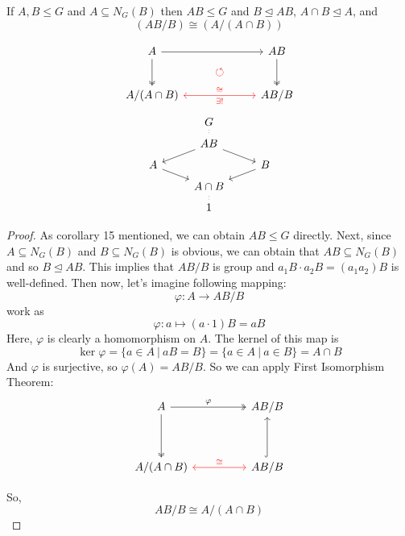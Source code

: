 \documentclass[12pt, a4paper, openany, twoside]{book}
\theoremstyle{definition}
\theoremstyle{remark}
\theoremstyle{plain}
\numberwithin{equation}{section}
\begin{document}
\begin{tcolorbox}[colback=yellow!10!white,colframe=blue!75!black,title=Second Isomorphism Theorem]

If $A, B \leq G$ and $A \subseteq N_G(B)$ then $AB \leq G$ and $B \trianglelefteq AB$, $A\cap B \trianglelefteq A$, and 
\[(AB / B) \cong (A / (A \cap B))\]

\[
\begin{tikzcd}[row sep = 0.5em]
    A \arrow[rr] \arrow[dd, two heads] & & AB \arrow[dd, two heads] \\
    & \mathcolor{red}{\circlearrowleft} & \\
    A/(A \cap B) \arrow[rr, red, leftrightarrow, "\cong", "\exists!"'] & & AB/B
\end{tikzcd}
\]
\[
\begin{tikzcd}[row sep = 0.5em]
    & G \arrow[d, no head, dotted] & \\
    & AB \arrow[ld] \arrow[rd] & \\
    A \arrow[rd] &  & B \arrow[ld] \\
    & A \cap B & \\
    & 1 \arrow[u, no head, dotted] & 
\end{tikzcd}
\]

\end{tcolorbox}

\begin{proof}
    
As corollary 15 mentioned, we can obtain $AB \leq G$ directly. Next, since $A \subseteq N_G(B)$ and $B \subseteq N_G(B)$ is obvious, we can obtain that $AB \subseteq N_G(B)$ and so $B \trianglelefteq AB$. This implies that $AB/B$ is group and $a_1B \cdot a_2B = (a_1 a_2)B$ is well-defined. Then now, let's imagine following mapping: 
\[\varphi: A \rightarrow AB/B\]
work as 
\[\varphi: a \mapsto (a\cdot 1)B = aB\]
Here, $\varphi$ is clearly a homomorphism on $A$. The kernel of this map is 
\[\ker \varphi = \{a \in A ~|~ aB = B\} = \{a \in A ~|~ a \in B\} = A \cap B\]
And $\varphi$ is surjective, so $\varphi(A) = AB/B$. 
So we can apply First Isomorphism Theorem: 
\[
\begin{tikzcd}
    A \arrow[rr, "\varphi", two heads] \arrow[dd, two heads] & & AB/B \\
      & &      \\
    A/(A\cap B) \arrow[rr, red, "\cong", leftrightarrow]& & AB/B \arrow[uu, hook]
\end{tikzcd}
\]

So, 
\[AB/B \cong A/(A \cap B)\]

\end{proof}
\end{document}
